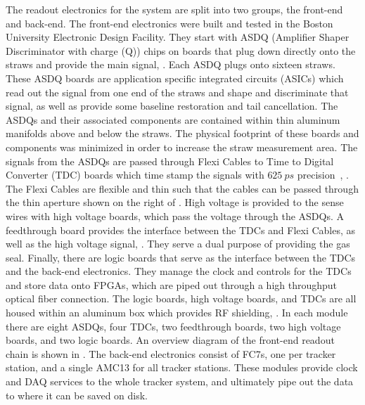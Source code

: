 The readout electronics for the system are split into two groups, the front-end and back-end. The front-end electronics were built and tested in the Boston University Electronic Design Facility. They start with ASDQ (Amplifier Shaper Discriminator with charge (Q)) chips on boards that plug down directly onto the straws and provide the main signal, . Each ASDQ plugs onto sixteen straws. These ASDQ boards are application specific integrated circuits (ASICs) which read out the signal from one end of the straws and shape and discriminate that signal, as well as provide some baseline restoration and tail cancellation. The ASDQs and their associated components are contained within thin aluminum manifolds above and below the straws. The physical footprint of these boards and components was minimized in order to increase the straw measurement area. The signals from the ASDQs are passed through Flexi Cables to Time to Digital Converter (TDC) boards which time stamp the signals with $\SI{625}{ps}$ precision~\cite{WTThesis}, . The Flexi Cables are flexible and thin such that the cables can be passed through the thin aperture shown on the right of . High voltage is provided to the sense wires with high voltage boards, which pass the voltage through the ASDQs. A feedthrough board provides the interface between the TDCs and Flexi Cables, as well as the high voltage signal, . They serve a dual purpose of providing the gas seal. Finally, there are logic boards that serve as the interface between the TDCs and the back-end electronics. They manage the clock and controls for the TDCs and store data onto FPGAs, which are piped out through a high throughput optical fiber connection. The logic boards, high voltage boards, and TDCs are all housed within an aluminum box which provides RF shielding, . In each module there are eight ASDQs, four TDCs, two feedthrough boards, two high voltage boards, and two logic boards. An overview diagram of the front-end readout chain is shown in . The back-end electronics consist of FC7s, one per tracker station, and a single AMC13 for all tracker stations. These modules provide clock and DAQ services to the whole tracker system, and ultimately pipe out the data to where it can be saved on disk.


